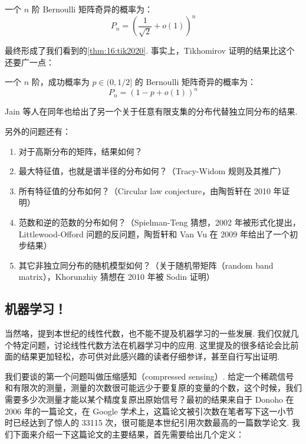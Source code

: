 \begin{theorem}[Bourgain, 2010]
    一个 $n$ 阶 Bernoulli 矩阵奇异的概率为：
    \[ P_n = \left( \frac{1}{\sqrt{2}} + o(1) \right)^n \]
\end{theorem}

最终形成了我们看到的\autoref{thm:16:tik2020}. 事实上，Tikhomirov 证明的结果比这个还要广一点：

\begin{theorem}[Tikhomirov, 2020]
    一个 $n$ 阶，成功概率为 $p \in (0, 1/2]$ 的 Bernoulli 矩阵奇异的概率为：
    \[ P_n = \left( 1 - p + o(1) \right)^n \]
\end{theorem}

Jain 等人在同年也给出了另一个关于任意有限支集的分布代替独立同分布的结果.

另外的问题还有：
\begin{enumerate}
    \item 对于高斯分布的矩阵，结果如何？

    \item 最大特征值，也就是谱半径的分布如何？（Tracy-Widom 规则及其推广）

    \item 所有特征值的分布如何？（Circular law conjecture，由陶哲轩在 2010 年证明）

    \item 范数和逆的范数的分布如何？（Spielman-Teng 猜想，2002 年被形式化提出，Littlewood-Offord 问题的反问题，陶哲轩和 Van Vu 在 2009 年给出了一个初步结果）

    \item 其它非独立同分布的随机模型如何？（关于随机带矩阵（random band matrix），Khorunzhiy 猜想在 2010 年被 Sodin 证明）
\end{enumerate}

\subsection{机器学习！}

当然咯，提到本世纪的线性代数，也不能不提及机器学习的一些发展. 我们仅就几个特定问题，讨论线性代数方法在机器学习中的应用. 这里提及的很多结论会比前面的结果更加轻松，亦可供对此感兴趣的读者仔细参详，甚至自行写出证明.

我们要谈的第一个问题叫做压缩感知（compressed sensing）. 给定一个稀疏信号和有限次的测量，测量的次数很可能远少于要复原的变量的个数，这个时候，我们需要多少次测量才能以某个精度复原出原始信号？最初的结果来自于 Donoho 在 2006 年的一篇论文，在 Google 学术上，这篇论文被引次数在笔者写下这一小节时已经达到了惊人的 33115 次，很可能是本世纪引用次数最高的一篇数学论文. 我们下面来介绍一下这篇论文的主要结果，首先需要给出几个定义：

